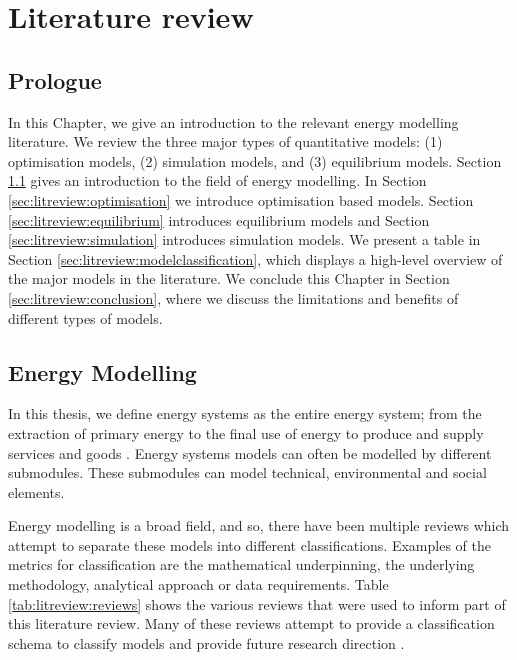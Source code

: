 \chapter{Literature review}
\label{chapter:litreview}
\ifpdf
\graphicspath{{Chapter3/Figs/Raster/}{Chapter3/Figs/PDF/}{Chapter3/Figs/}}
\else
\graphicspath{{Chapter3/Figs/Vector/}{Chapter3/Figs/}}
\fi

\section*{Prologue}

In this Chapter, we give an introduction to the relevant energy modelling literature. We review the three major types of quantitative models: (1) optimisation models, (2) simulation models, and (3) equilibrium models. Section \ref{sec:litreview:energymodelling} gives an introduction to the field of energy modelling. In Section \ref{sec:litreview:optimisation} we introduce optimisation based models. Section \ref{sec:litreview:equilibrium} introduces equilibrium models and Section \ref{sec:litreview:simulation} introduces simulation models. We present a table in Section \ref{sec:litreview:modelclassification}, which displays a high-level overview of the major models in the literature. We conclude this Chapter in Section \ref{sec:litreview:conclusion}, where we discuss the limitations and benefits of different types of models.

\section{Energy Modelling}
\label{sec:litreview:energymodelling}


In this thesis, we define energy systems as the entire energy system; from the extraction of primary energy to the final use of energy to produce and supply services and goods \cite{Pfenninger2014b}. Energy systems models can often be modelled by different submodules. These submodules can model technical, environmental and social elements.


Energy modelling is a broad field, and so, there have been multiple reviews which attempt to separate these models into different classifications. Examples of the metrics for classification are the mathematical underpinning, the underlying methodology, analytical approach or data requirements. Table \ref{tab:litreview:reviews} shows the various reviews that were used to inform part of this literature review. Many of these reviews attempt to provide a classification schema to classify models \cite{Hall2016a, Savvidis2019a} and provide future research direction \cite{Pfenninger2014b,Savvidis2019a}. 


